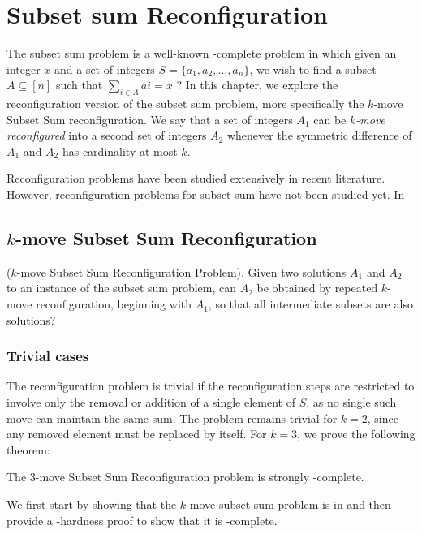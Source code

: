 \chapter{Subset sum Reconfiguration}
The subset sum problem is a well-known \NP-complete problem in which given an integer $x$ and a set of integers $S = \{a_1, a_2,\dots, a_n\}$,
we wish to find a subset $A \subseteq [n]$ such that $\sum_{i \in A} ai = x$ ? In this chapter, we explore the reconfiguration version of the
subset sum problem, more specifically the $k$-move Subset Sum reconfiguration. We say that a set of integers $A_1$ can be
\textit{$k$-move reconfigured} into a second set of integers $A_2$ whenever the symmetric difference of $A_1$ and $A_2$ has cardinality at most $k$.

Reconﬁguration problems have been studied extensively in recent literature. However, reconﬁguration problems for subset sum have not been studied yet.
In \cite{app}
\section{$k$-move Subset Sum Reconfiguration}
\begin{defn}{($k$-move Subset Sum Reconfiguration Problem).} Given two solutions $A_1$ and $A_2$ to an instance of the subset sum problem, can $A_2$ be obtained
by repeated $k$-move reconfiguration, beginning with $A_1$, so that all intermediate subsets are also solutions?
\end{defn}

\subsection{Trivial cases}
The reconfiguration problem is trivial if the reconfiguration steps are restricted to involve only the removal or addition of a single element
of $S$, as no single such move can maintain the same sum. The problem remains trivial for $k=2$, since any removed element must be replaced by itself.
For $k=3$, we prove the following theorem: \begin{theorem}The $3$-move Subset Sum Reconfiguration problem is strongly \PSPACE-complete.\end{theorem}

We first start by showing that the $k$-move subset sum problem is in \PSPACE and then provide a \PSPACE-hardness proof to show that it is \PSPACE-complete.

